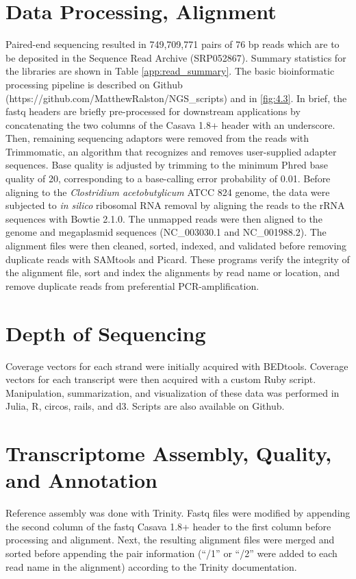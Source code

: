 \section{Data Processing, Alignment}\label{methods:read_process_align}
Paired-end sequencing resulted in 749,709,771 pairs of 76 bp reads which are to be deposited in the Sequence Read Archive (SRP052867). Summary statistics for the libraries are shown in Table \ref{app:read_summary}. The basic bioinformatic processing pipeline is described on Github (https://github.com/MatthewRalston/NGS_scripts) and in \ref{fig:4.3}. In brief, the fastq headers are briefly pre-processed for downstream applications by concatenating the two columns of the Casava 1.8+ header with an underscore. Then, remaining sequencing adaptors were removed from the reads with Trimmomatic\cite{47}, an algorithm that recognizes and removes user-supplied adapter sequences. Base quality is adjusted by trimming to the minimum Phred base quality of 20, corresponding to a base-calling error probability of 0.01. Before aligning to the \textit{Clostridium acetobutylicum} ATCC 824 genome, the data were subjected to \textit{in silico} ribosomal RNA removal by aligning the reads to the rRNA sequences with Bowtie 2.1.0\cite{17}. The unmapped reads were then aligned to the genome and megaplasmid sequences (NC_003030.1 and NC_001988.2). The alignment files were then cleaned, sorted, indexed, and validated before removing duplicate reads with SAMtools\cite{19} and Picard\cite{40}. These programs verify the integrity of the alignment file, sort and index the alignments by read name or location, and remove duplicate reads from preferential PCR-amplification.

\section{Depth of Sequencing}
Coverage vectors for each strand were initially acquired with BEDtools\cite{49}. Coverage vectors for each transcript were then acquired with a custom Ruby script. Manipulation, summarization, and visualization of these data was performed in Julia, R\cite{59}, circos, rails, and d3. Scripts are also available on Github. 

\section{Transcriptome Assembly, Quality, and Annotation}
Reference assembly was done with Trinity\cite{58}. Fastq files were modified by appending the second column of the fastq Casava 1.8+ header to the first column before processing and alignment. Next, the resulting alignment files were merged and sorted before appending the pair information (``/1'' or ``/2'' were added to each read name in the alignment) according to the Trinity documentation.

